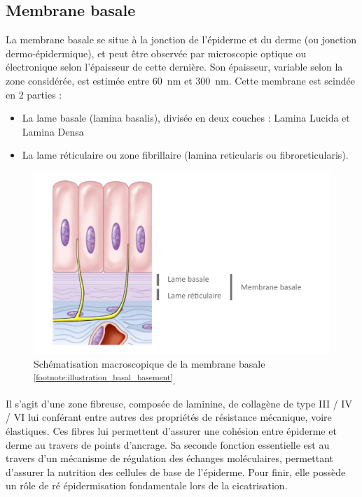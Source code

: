\subsection{Membrane basale}
La membrane basale se situe à la jonction de l’épiderme et du derme (ou jonction dermo-épidermique), et peut être observée par microscopie optique ou électronique selon l’épaisseur de cette dernière. Son épaisseur, variable selon la zone considérée, est estimée entre \SI{60}{\nano\metre} et \SI{300}{\nano\metre}. 
Cette membrane est scindée en 2 parties :
\begin{itemize}
\item La lame basale (lamina basalis), divisée en deux couches : Lamina Lucida et Lamina Densa
\item La lame réticulaire ou zone fibrillaire (lamina reticularis ou fibroreticularis).
\end{itemize}\par
\begin{figure}[H]
    \centering
    \includegraphics[width=\linewidth]{contents/chapter_1/resources/illustration_basal_basement.pdf}
    \caption{Schématisation macroscopique de la membrane basale \textsuperscript{\ref{footnote:illustration_basal_basement}}.}
    \label{fig:illustration_basal_basement}
\end{figure}\par

\addtocounter{footnote}{1}

Il s’agit d’une zone fibreuse, composée de laminine, de collagène de type III / IV / VI lui conférant entre autres des propriétés de résistance mécanique, voire élastiques. Ces fibres lui permettent d’assurer une cohésion entre épiderme et derme au travers de points d’ancrage. Sa seconde fonction essentielle est au travers d’un mécanisme de régulation des échanges moléculaires, permettant d’assurer la nutrition des cellules de base de l’épiderme. Pour finir, elle possède un rôle de ré épidermisation fondamentale lors de la cicatrisation.\par
\clearpage

